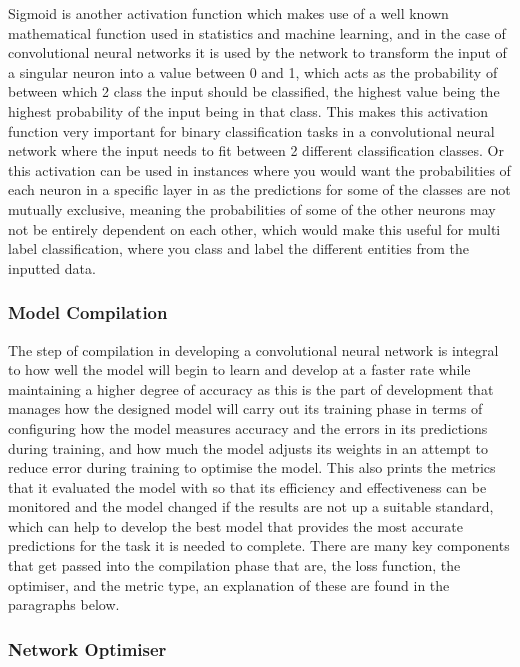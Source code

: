 \documentclass[]{final_report}
\begin{document}
Sigmoid is another activation function which makes use of a well known mathematical function used in statistics and machine learning, and in the case of convolutional neural networks it is used by the network to transform the input of a singular neuron into a value between 0 and 1, which acts as the probability of between which 2 class the input should be classified, the highest value being the highest probability of the input being in that class. This makes this activation function very important for binary classification tasks in a convolutional neural network where the input needs to fit between 2 different classification classes. Or this activation can be used in instances where you would want the probabilities of each neuron in a specific layer in as the predictions for some of the classes are not mutually exclusive, meaning the probabilities of some of the other neurons may not be entirely dependent on each other, which would make this useful for multi label classification, where you class and label the different entities from the inputted data.\cite{UpGrad2025}

\subsubsection{Model Compilation}

The step of compilation in developing a convolutional neural network is integral to how well the model will begin to learn and develop at a faster rate while maintaining a higher degree of accuracy as this is the part of development that manages how the designed model will carry out its training phase in terms of configuring how the model measures accuracy and the errors in its predictions during training, and how much the model adjusts its weights in an attempt to reduce error during training to optimise the model. This also prints the metrics that it evaluated the model with so that its efficiency and effectiveness can be monitored and the model changed if the results are not up a suitable standard, which can help to develop the best model that provides the most accurate predictions for the task it is needed to complete. There are many key components that get passed into the compilation phase that are, the loss function, the optimiser, and the metric type, an explanation of these are found in the paragraphs below. 

\subsubsection{Network Optimiser}
\end{document}
